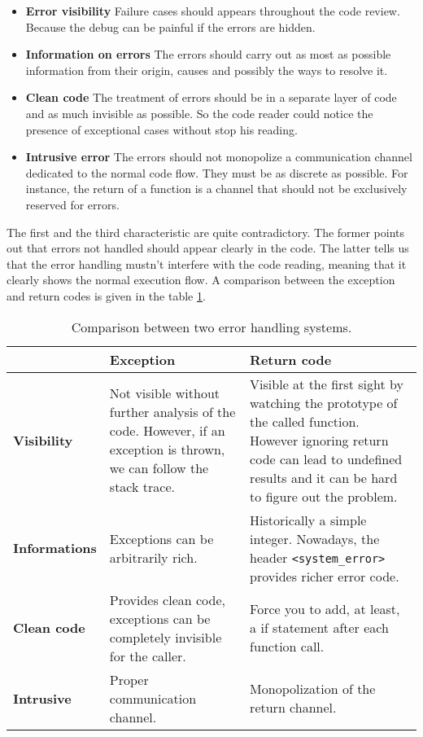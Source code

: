 \documentclass[a4paper,10pt]{article}
\newcommand{\cpp}[1]{\lstinline{#1}}
\begin{document}
\begin{itemize}
 \item \textbf{Error visibility} Failure cases should appears throughout the code review. Because the debug can be painful if the errors are hidden.
 \item \textbf{Information on errors} The errors should carry out as most as possible information from their origin, causes and possibly the ways to resolve it.
 \item \textbf{Clean code} The treatment of errors should be in a separate layer of code and as much invisible as possible. So the code reader could notice the presence of exceptional cases without stop his reading.
 \item \textbf{Intrusive error} The errors should not monopolize a communication channel dedicated to the normal code flow. They must be as discrete as possible. For instance, the return of a function is a channel that should not be exclusively reserved for errors.
\end{itemize}

The first and the third characteristic are quite contradictory. The former points out that errors not handled should appear clearly in the code. The latter tells us that the error handling mustn't interfere with the code reading, meaning that it clearly shows the normal execution flow. A comparison between the exception and return codes is given in the table \ref{comp-handling-error}.


\begin{table}
\bgroup
\def\arraystretch{1.5}
\begin{tabular}{|l|>{\raggedright\arraybackslash}p{5cm}|>{\raggedright\arraybackslash}p{5cm}|}
\hline
                    & \textbf{Exception} & \textbf{Return code} \\
\hline
\textbf{Visibility} & Not visible without further analysis of the code. However, if an exception is thrown, we can follow the stack trace. & Visible at the first sight by watching the prototype of the called function. However ignoring return code can lead to undefined results and it can be hard to figure out the problem. \\
\hline
\textbf{Informations} & Exceptions can be arbitrarily rich. & Historically a simple integer. Nowadays, the header \cpp{<system_error>} provides richer error code. \\
\hline
\textbf{Clean code} & Provides clean code, exceptions can be completely invisible for the caller. & Force you to add, at least, a if statement after each function call. \\
\hline
\textbf{Intrusive} & Proper communication channel. & Monopolization of the return channel. \\
\hline
\end{tabular}
\egroup
\caption{Comparison between two error handling systems.}
\label{comp-handling-error}
\end{table}
\end{document}
